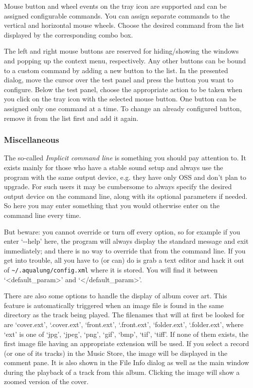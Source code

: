 \documentclass[10pt,english]{article}
\begin{document}
Mouse button and wheel events on the tray icon are
supported and can be assigned configurable commands. You can
assign separate commands to the vertical and horizontal
mouse wheels. Choose the desired command from the list
displayed by the corresponding combo box.




The left and right mouse buttons are reserved for
hiding/showing the windows and popping up the context menu,
respectively. Any other buttons can be bound to a custom
command by adding a new button to the list. In the presented
dialog, move the cursor over the test panel and press the
button you want to configure. Below the test panel, choose
the appropriate action to be taken when you click on the
tray icon with the selected mouse button. One button can be
assigned only one command at a time. To change an already
configured button, remove it from the list first and add it
again.




\subsubsection{Miscellaneous\label{idp840032}}



\noindent The so-called \textsl{Implicit command line} is something
you should pay attention to. It exists mainly for those who
have a stable sound setup and always use the program with the
same output device, e.g. they have only OSS and don't plan to
upgrade. For such users it may be cumbersome to always specify
the desired output device on the command line, along with its
optional parameters if needed. So here you may enter something
that you would otherwise enter on the command line every
time.




But beware: you cannot override or turn off every option,
so for example if you enter `{-}{-}help' here, the program
will always display the standard message and exit immediately;
and there is no way to override that from the command line. If
you get into trouble, all you have to (or can) do is grab a
text editor and hack it out of
\texttt{\textasciitilde{}/.aqualung/config.xml} where it is stored. You
will find it between `<default\_param>' and
`</default\_param>'.




There are also some options to handle the display of album
cover art. This feature is automatically triggered when an
image file is found in the same directory as the track being
played. The filenames that will at first be looked for are
`cover.ext', `.cover.ext', `front.ext',
`.front.ext', `folder.ext', `.folder.ext',
where `ext' is one of `jpg', `jpeg',
`png', `gif', `bmp', `tif',
`tiff'. If none of them exists, the first image file
having an appropriate extension will be used. If you select a
record (or one of its tracks) in the Music Store, the image
will be displayed in the comment pane. It is also shown in the
File Info dialog as well as the main window during the
playback of a track from this album. Clicking the image will
show a zoomed version of the cover.
\end{document}
